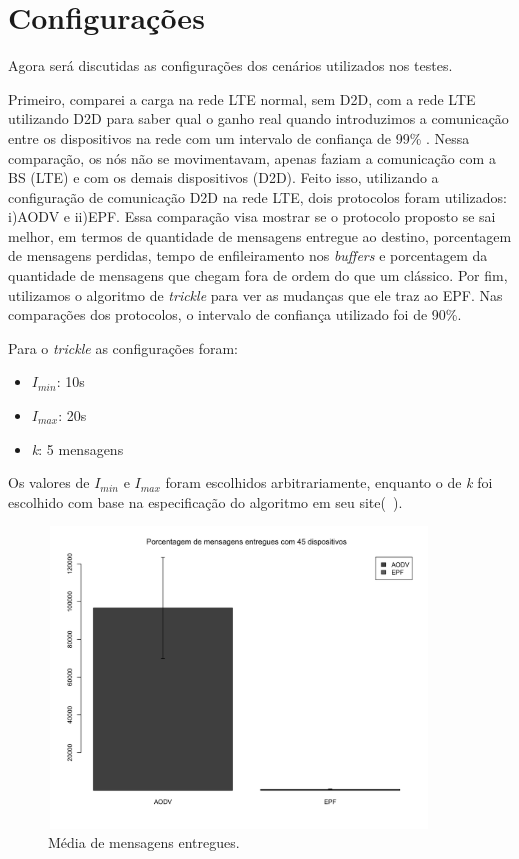 \documentclass[11pt,a4paper,titlepage]{article}
\begin{document}
\section{Configurações}\label{sec:conf}

Agora será discutidas as configurações dos cenários utilizados nos testes.

Primeiro, comparei a carga na rede LTE normal, sem D2D, com a rede LTE utilizando D2D para saber qual o ganho real quando introduzimos a comunicação entre os dispositivos na rede com um intervalo de confiança de 99\% .
Nessa comparação, os nós não se movimentavam, apenas faziam a comunicação com a BS (LTE) e com os demais dispositivos (D2D).
Feito isso, utilizando a configuração de comunicação D2D na rede LTE, dois protocolos foram utilizados: i)AODV e ii)EPF.
Essa comparação visa mostrar se o protocolo proposto se sai melhor, em termos de quantidade de mensagens entregue ao destino, porcentagem de mensagens perdidas, tempo de enfileiramento nos \textit{buffers} e porcentagem da quantidade de mensagens que chegam fora de ordem do que um clássico.
Por fim, utilizamos o algoritmo de \textit{trickle} para ver as mudanças que ele traz ao EPF.
Nas comparações dos protocolos, o intervalo de confiança utilizado foi de 90\%.

Para o \textit{trickle} as configurações foram:

\begin{itemize}
\item $I_{min}$: 10s
\item $I_{max}$: 20s
\item \textit{k}: 5 mensagens
\end{itemize}

Os valores de $I_{min}$ e $I_{max}$ foram escolhidos arbitrariamente, enquanto o de \textit{k} foi escolhido com base na especificação do algoritmo em seu site(~\cite{Trickle}).

\begin{figure}[ht]
\centering
\includegraphics[height=8cm, width=0.9\textwidth]{images/entr.jpg}
\caption{Média de mensagens entregues.}
\label{fig:entr}
\end{figure}
\end{document}
